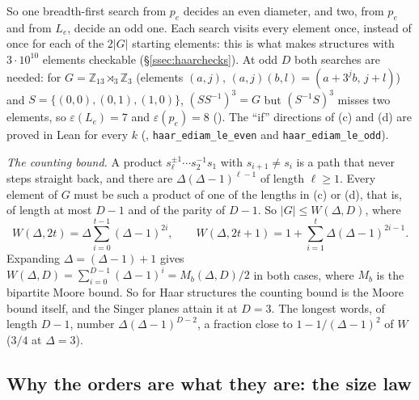 \documentclass[11pt]{amsart}
\theoremstyle{definition}
\theoremstyle{remark}
\begin{document}
So one breadth-first search from $p_e$ decides an even diameter, and two, from $p_e$ and from $L_e$, decide an odd one. Each search visits every element once, instead of once for each of the $2|G|$ starting elements: this is what makes structures with $3\cdot10^{10}$ elements checkable (\S\ref{ssec:haarchecks}). At odd $D$ both searches are needed: for $G=\mathbb{Z}_{13}\rtimes_3\mathbb{Z}_3$ (elements $(a,j)$, $(a,j)(b,l)=(a+3^jb,\,j+l)$) and $S=\{(0,0),(0,1),(1,0)\}$, $(SS^{-1})^3=G$ but $(S^{-1}S)^3$ misses two elements, so $\varepsilon(L_e)=7$ and $\varepsilon(p_e)=8$ (). The ``if'' directions of (c) and (d) are proved in Lean for every $k$ (, \texttt{haar\_ediam\_le\_even} and \texttt{haar\_ediam\_le\_odd}).

\emph{The counting bound.} A product $s_\ell^{\pm1}\cdots s_2^{-1}s_1$ with $s_{i+1}\ne s_i$ is a path that never steps straight back, and there are $\Delta(\Delta-1)^{\ell-1}$ of length $\ell\ge1$. Every element of $G$ must be such a product of one of the lengths in (c) or (d), that is, of length at most $D-1$ and of the parity of $D-1$. So $|G|\le W(\Delta,D)$, where
$$W(\Delta,2t)=\Delta\sum_{i=0}^{t-1}(\Delta-1)^{2i},\qquad W(\Delta,2t+1)=1+\sum_{i=1}^{t}\Delta(\Delta-1)^{2i-1}.$$
Expanding $\Delta=(\Delta-1)+1$ gives $W(\Delta,D)=\sum_{i=0}^{D-1}(\Delta-1)^i=M_b(\Delta,D)/2$ in both cases, where $M_b$ is the bipartite Moore bound. So for Haar structures the counting bound is the Moore bound itself, and the Singer planes attain it at $D=3$. The longest words, of length $D-1$, number $\Delta(\Delta-1)^{D-2}$, a fraction close to $1-1/(\Delta-1)^2$ of $W$ ($3/4$ at $\Delta=3$).

\subsection{Why the orders are what they are: the size law}\label{ssec:sizelaw}
\end{document}
